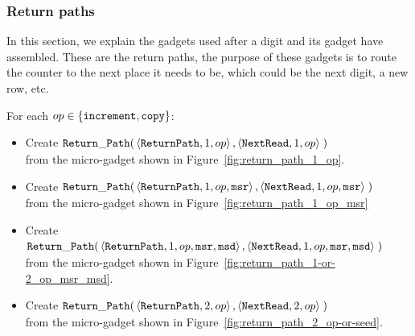 

\subsubsection{ Return paths}
In this section, we explain the gadgets used after a digit and its {\dtop} gadget have assembled. These
are the return paths, the purpose of these gadgets is to route the counter to the next place it needs to be, which
could be the next digit, a new row, etc.


For each $op\in \{ {\tt increment}, {\tt copy} \}$:

\begin{itemize}

    \item Create
    $\begin{aligned}[t]
        {\tt Return\_Path}(& \left\langle {\tt ReturnPath},    1, op \right\rangle,
                           \left\langle {\tt NextRead}, 1, op \right\rangle \;)
    \end{aligned}$\\from the micro-gadget shown in Figure~\ref{fig:return_path_1_op}.

    \item Create
    $\begin{aligned}[t]
        {\tt Return\_Path}(& \left\langle {\tt ReturnPath},    1, op, {\tt msr} \right\rangle,
                           \left\langle {\tt NextRead}, 1, op, {\tt msr} \right\rangle \;)
    \end{aligned}$\\from the micro-gadget shown in Figure~\ref{fig:return_path_1_op_msr}

    \item Create
    $\begin{aligned}[t]
        {\tt Return\_Path}(& \left\langle {\tt ReturnPath},    1, op, {\tt msr}, {\tt msd} \right\rangle,
                           \left\langle {\tt NextRead}, 1, op, {\tt msr}, {\tt msd} \right\rangle \;)
    \end{aligned}$\\from the micro-gadget shown in Figure~\ref{fig:return_path_1-or-2_op_msr_msd}.


    \item Create
    $\begin{aligned}[t]
        {\tt Return\_Path}(& \left\langle {\tt ReturnPath},    2, op \right\rangle,
                           \left\langle {\tt NextRead}, 2, op \right\rangle \;)
    \end{aligned}$\\from the micro-gadget shown in Figure~\ref{fig:return_path_2_op-or-seed}.


\end{itemize}
